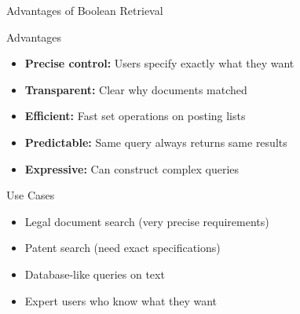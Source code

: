 \documentclass[aspectratio=169]{beamer}
\newif\ifanimated
\newcommand{\cpause}{\ifanimated\pause\fi}
\begin{document}
\begin{frame}[shrink=10]{Advantages of Boolean Retrieval}
\begin{block}{\checkmark Advantages}
\begin{itemize}
    \item[\checkmark] \textbf{Precise control:} Users specify exactly what they want
    \item[\checkmark] \textbf{Transparent:} Clear why documents matched
    \item[\checkmark] \textbf{Efficient:} Fast set operations on posting lists
    \item[\checkmark] \textbf{Predictable:} Same query always returns same results
    \item[\checkmark] \textbf{Expressive:} Can construct complex queries
\end{itemize}
\cpause
\end{block}
\vspace{1em}

\begin{exampleblock}{Use Cases}
\begin{itemize}
    \item Legal document search (very precise requirements)
    \item Patent search (need exact specifications)
    \item Database-like queries on text
    \item Expert users who know what they want
\end{itemize}
\end{exampleblock}
\end{frame}
\end{document}
